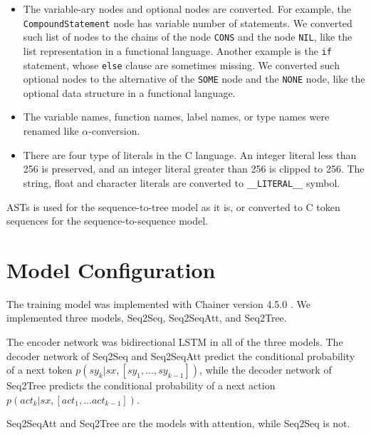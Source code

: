 \documentclass[senior,final,11pt]{iscs-thesis}
\begin{document}
\begin{itemize}
\item The variable-ary nodes and optional nodes are converted. 
For example, the \texttt{CompoundStatement} node has variable number of statements. 
We converted such list of nodes to the chains of the node \texttt{CONS} and the node \texttt{NIL}, like the list representation in a functional language.
Another example is the \texttt{if} statement, whose \texttt{else} clause are sometimes missing. 
We converted such optional nodes to the alternative of the \texttt{SOME} node and the \texttt{NONE} node, like the optional data structure in a functional language.
\item The variable names, function names, label names, or type names were renamed like $\alpha$-conversion.
\item There are four type of literals in the C language. 
An integer literal less than 256 is preserved, and an integer literal greater than 256 is clipped to 256.
The string, float and character literals are converted to \texttt{\_\_LITERAL\_\_} symbol.

\end{itemize}

ASTs is used for the sequence-to-tree model as it is, or converted to C token sequences for the sequence-to-sequence model. 

\section{Model Configuration}
The training model was implemented with Chainer version 4.5.0 \citep{chainer}.
We implemented three models, Seq2Seq, Seq2SeqAtt, and Seq2Tree.

The encoder network was bidirectional LSTM in all of the three models.
The decoder network of Seq2Seq and Seq2SeqAtt predict the conditional probability of a next token $ p(sy_k|sx,[sy_1,\dots,sy_{k-1}]) $,
while the decoder network of Seq2Tree predicts the conditional probability of a next action $ p(act_{k}|sx,[act_1, \dots act_{k-1}]) $.

Seq2SeqAtt and Seq2Tree are the models with attention, while Seq2Seq is not.
\end{document}
